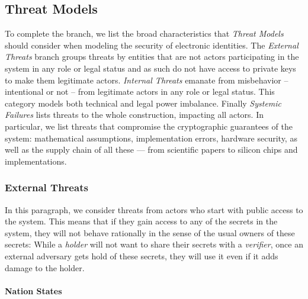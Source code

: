 \subsection{Threat Models}
\label{subsub:threat_models}

To complete the \emph{\rot} branch, we list the broad characteristics that \emph{Threat Models} should consider when modeling the security of electronic identities.
The \emph{External Threats} branch groups threats by entities that are not actors participating in the system in any role or legal status and as such do not have access to private keys to make them legitimate actors.
\emph{Internal Threats} emanate from misbehavior -- intentional or not -- from legitimate actors in any role or legal status. This category models both technical and legal power imbalance.
Finally \emph{Systemic Failures} lists threats to the whole construction, impacting all actors. In particular, we list threats that compromise the cryptographic guarantees of the system: mathematical assumptions, implementation errors, hardware security, as well as the supply chain of all these --- from scientific papers to silicon chips and implementations.

\vspace{1em}



\subsubsection{External Threats}

In this paragraph, we consider threats from actors who start with public access
to the system.
This means that if they gain access to any of the secrets in the system, they will
not behave rationally in the sense of the usual owners of these secrets:
While a \emph{holder} will not want to share their secrets with a \emph{verifier},
once an external adversary gets hold of these secrets, they will use it even if it adds
damage to the holder.

\paragraph{Nation States}
\label{subp:nation_state}

